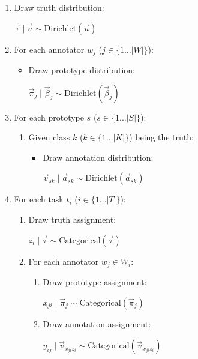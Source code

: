 \documentclass[letterpaper]{article} %
\begin{document}
\begin{enumerate}[label=\arabic*., leftmargin=2.3em]
    \item Draw truth distribution:

    $\vec{\tau} \mid \vec{u} \sim \text{Dirichlet}(\vec{u})$
    \item For each annotator $w_{j}$ ($j\in \{1\ldots |W|\}$):
     \begin{itemize}[leftmargin=1.5em]
            \item Draw prototype distribution:

            $\vec{\pi}_{j} \mid \vec{\beta}_{j} \sim \text{Dirichlet}(\vec{\beta}_{j})$
     \end{itemize}
    \item For each prototype $s$ ($s\in \{1\ldots |S|\}$):
    \begin{enumerate}[label*=\arabic*., leftmargin=2em]
    \item Given class $k$ ($k\in \{1\ldots |K|\}$) being the truth:
            \begin{itemize}[leftmargin=1.5em]
            \item Draw annotation distribution:

            $\vec{v}_{sk} \mid \vec{a}_{sk} \sim \text{Dirichlet}(\vec{a}_{sk})$
            \end{itemize}
     \end{enumerate}
    \item For each task $t_{i}$ ($i \in \{1\ldots |T|\}$):
    \begin{enumerate}[label*=\arabic*., leftmargin=2em]
        \item Draw truth assignment:

        $z_i \mid \vec{\tau} \sim \text{Categorical}(\vec{\tau})$
        \item For each annotator $w_{j} \in W_{i}$:
        \begin{enumerate}[label*=\arabic*., leftmargin=2.8em]
        \item Draw prototype assignment:

        $x_{ji} \mid \vec{\pi}_{j} \sim \text{Categorical}(\vec{\pi}_{j})$
        \item Draw annotation assignment:

        $y_{ij} \mid \vec{v}_{x_{ji}z_{i}} \sim \text{Categorical}(\vec{v}_{x_{ji}z_{i}})$
        \end{enumerate}
    \end{enumerate}
\end{enumerate}
\end{document}
